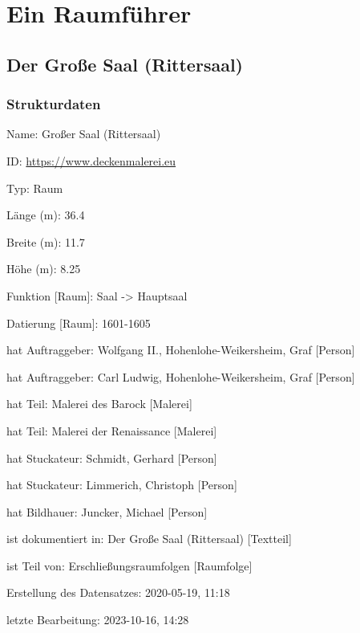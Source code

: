 \documentclass[
  a4paper,
  openany]{book}
\begin{document}
\tableofcontents
{\let\newpage\relax}

\RaggedRight

\mainmatter
{}

\chapter{Ein Raumführer}\label{ein-raumfuxfchrer}

\section{Der Große Saal
(Rittersaal)}\label{der-grouxdfe-saal-rittersaal}

\subsection{Strukturdaten}\label{strukturdaten}

Name: Großer Saal (Rittersaal)

ID:
\href{https://www.deckenmalerei.eu/15685f4a-3727-4110-8967-1d8287431997}{https://www.deckenmalerei.eu}

Typ: Raum

Länge (m): 36.4

Breite (m): 11.7

Höhe (m): 8.25

Funktion {[}Raum{]}: Saal -\textgreater{} Hauptsaal

Datierung {[}Raum{]}: 1601-1605

hat Auftraggeber: Wolfgang II., Hohenlohe-Weikersheim, Graf {[}Person{]}

hat Auftraggeber: Carl Ludwig, Hohenlohe-Weikersheim, Graf {[}Person{]}

hat Teil: Malerei des Barock {[}Malerei{]}

hat Teil: Malerei der Renaissance {[}Malerei{]}

hat Stuckateur: Schmidt, Gerhard {[}Person{]}

hat Stuckateur: Limmerich, Christoph {[}Person{]}

hat Bildhauer: Juncker, Michael {[}Person{]}

ist dokumentiert in: Der Große Saal (Rittersaal) {[}Textteil{]}

ist Teil von: Erschließungsraumfolgen {[}Raumfolge{]}

Erstellung des Datensatzes: 2020-05-19, 11:18

letzte Bearbeitung: 2023-10-16, 14:28
\end{document}
